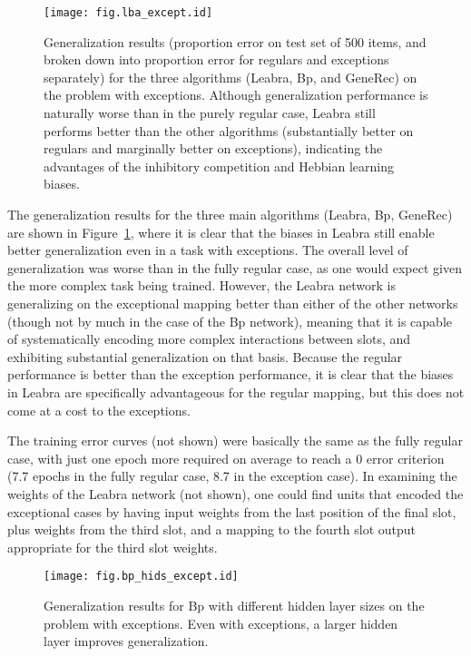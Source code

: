 \documentclass[12pt,twoside]{article}
\begin{document}
\begin{figure}
  \centering\texttt{[image: fig.lba\_except.id]}
  \caption{\small Generalization results (proportion error on test
    set of 500 items, and broken down into proportion error for
    regulars and exceptions separately) for the three algorithms
    (Leabra, Bp, and GeneRec) on the problem with exceptions.
    Although generalization performance is naturally worse than in the
    purely regular case, Leabra still performs better than the other
    algorithms (substantially better on regulars and marginally better
    on exceptions), indicating the advantages of the inhibitory
    competition and Hebbian learning biases.}
  \label{fig.lba_except}
\end{figure}

The generalization results for the three main algorithms (Leabra, Bp,
GeneRec) are shown in Figure~\ref{fig.lba_except}, where it is clear
that the biases in Leabra still enable better generalization even in a
task with exceptions.  The overall level of generalization was worse
than in the fully regular case, as one would expect given the more
complex task being trained.  However, the Leabra network is
generalizing on the exceptional mapping better than either of the
other networks (though not by much in the case of the Bp network),
meaning that it is capable of systematically encoding more complex
interactions between slots, and exhibiting substantial generalization
on that basis.  Because the regular performance is better than the
exception performance, it is clear that the biases in Leabra are
specifically advantageous for the regular mapping, but this does not
come at a cost to the exceptions.

The training error curves (not shown) were basically the same as the
fully regular case, with just one epoch more required on average to
reach a 0 error criterion (7.7 epochs in the fully regular case, 8.7
in the exception case).  In examining the weights of the Leabra
network (not shown), one could find units that encoded the exceptional
cases by having input weights from the last position of the final
slot, plus weights from the third slot, and a mapping to the fourth
slot output appropriate for the third slot weights.

\begin{figure}
  \centering\texttt{[image: fig.bp\_hids\_except.id]}
  \caption{\small Generalization results for Bp with different hidden
    layer sizes on the problem with exceptions.  Even with exceptions,
    a larger hidden layer improves generalization.}
  \label{fig.bp_hids_except}
\end{figure}
\end{document}
